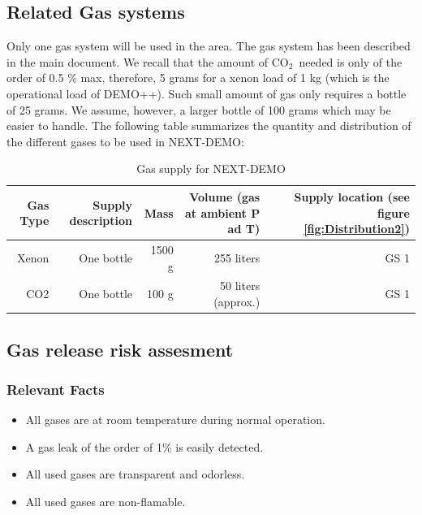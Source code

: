 \subsection{Related Gas systems}

Only one gas system will be used in the area. The gas system has been described in the main document. We recall that the amount of CO$_2$~needed is only of the order of 0.5 \% max, therefore, 5 grams for a xenon load of 1 kg (which is the operational load of DEMO++). Such small amount of gas only requires a bottle of 25 grams. We assume, however, a larger bottle of 100 grams which may be easier to handle. The following table summarizes the quantity and distribution of the different gases to be used in NEXT-DEMO:



\begin{table}[h]
\begin{tabular}{|r|r|r|r|r|}
\hline
\parbox[t]{2cm}{Gas Type} & \parbox[t]{3cm}{Supply description} & \parbox[t]{2cm}{Mass} &\parbox[t]{3cm}{ Volume (gas at ambient P ad T) }& \parbox[t]{3cm}{Supply location (see figure \ref{fig:Distribution2}) }\\\hline
Xenon & One bottle & 1500 g & 255 liters & GS 1  \\\hline
CO2 & One bottle & 100 g & 50 liters (approx.) & GS 1 \\\hline
\end{tabular}
\caption{Gas supply for NEXT-DEMO}
\label{tab:gassupply}
\end{table}

\subsection{Gas release risk assesment}

\subsubsection{Relevant Facts}
\begin{itemize}
\item All gases are at room temperature during normal operation.
\item A gas leak of the order of 1\% is easily detected.
\item All used gases are transparent and odorless.
\item All used gases are non-flamable. 
\end{itemize}

